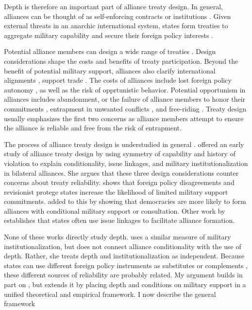 \documentclass[12pt]{article}
\begin{document}
Depth is therefore an important part of alliance treaty design. 
In general, alliances can be thought of as self-enforcing contracts or institutions \citep{Leedsetal2002, Morrow2000}.
Given external threats in an anarchic international system, states form treaties to aggregate military capability and secure their foreign policy interests \citep{Altfield1984, Smith1995, Snyder1997, FordhamPoast2014}. 


Potential alliance members can design a wide range of treaties \citep{Leedsetal2000, Leedsetal2002, Benson2012, BensonClinton2016}. 
Design considerations shape the costs and benefits of treaty participation. 
Beyond the benefit of potential military support, alliances also clarify international alignments \citep{Snyder1990}, support trade \citep{Gowa1995, Long2003, Fordham2010, WolfordKim2017}. 
The costs of alliances include lost foreign policy autonomy \citep{Altfield1984, Morrow2000, Johnson2015}, as well as the risk of opprtunistic behavior. 
Potential opportunism in alliances includes abandonment, or the failure of alliance members to honor their commitments \citep{BerkemeierFuhrmann2018}, entrapment in unwanted conflicts \citep{Snyder1984}, and free-riding \citep{Morrow2000}.  
Treaty design usually emphasizes the first two concerns as alliance members attempt to ensure the alliance is reliable and free from the risk of entrapment. 


The process of alliance treaty design is understudied in general \citep{Poast2019a}. 
\citet{Mattes2012} offered an early study of alliance treaty design by using symmetry of capability and history of violation to explain conditionality, issue linkages, and military institutionalization in bilateral alliances. 
She argues that these three design considerations counter concerns about treaty reliability. 
\citet{Benson2012} shows that foreign policy disagreements and revisionist protege states increase the likelihood of limited military support commitments. 
\citep{Chibaetal2015} added to this by showing that democracies are more likely to form alliances with conditional military support or consultation. 
Other work by \citet{Poast2012, Poast2013} establishes that states often use issue linkages to facilitate alliance formation. 


None of these works directly study depth. 
\citet{Mattes2012} uses a similar measure of military institutionalization, but does not connect alliance conditionality with the use of depth. 
Rather, she treats depth and institutionalization as independent. 
Because states can use different foreign policy instruments as substitutes or complements \citep{Starr2000, MorganPalmer2000}, these different sources of reliability are probably related. 
My argument builds in part on \citet{Mattes2012}, but extends it by placing depth and conditions on military support in a unified theoretical and empirical framework. 
I now describe the general framework 
\end{document}
